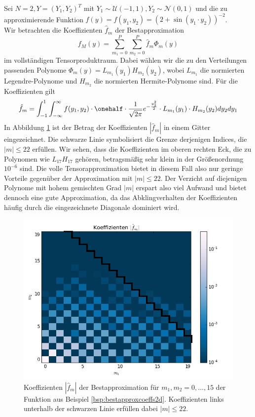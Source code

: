 \begin{mathbsp}
\label{bsp:bestapproxcoeffs2d}
Sei $N=2, Y=(Y_1,Y_2)^T$ mit $Y_1\sim \mathcal{U}(-1,1), Y_2\sim\mathcal{N}(0,1)$ und die zu approximierende Funktion $f(y)=f(y_1,y_2)=(2+\sin(y_1\cdot y_2))^{-2}$.\\
Wir betrachten die Koeffizienten $\hat{f}_m$ der Bestapproximation \[f_M(y)=\sum_{m_1=0}^P\sum_{m_2=0}^P\hat{f}_m\Phi_m(y)\] im vollständigen Tensorproduktraum. Dabei wählen wir die zu den Verteilungen passenden Polynome $\Phi_m(y)=L_{m_1}(y_1)H_{m_2}(y_2)$, wobei $L_{m_1}$ die normierten Legendre-Polynome und $H_{m_2}$ die normierten Hermite-Polynome sind. Für die Koeffizienten gilt
\[\hat{f}_m=\int_{-1}^1\int_{-\infty}^\infty f(y_1,y_2)\cdot \onehalf \cdot \frac{1}{\sqrt{2\pi}}e^{-\frac{y_2^2}{2}}\cdot L_{m_1}(y_1)\cdot H_{m_2}(y_2)dy_2dy_1\]
In Abbildung \ref{fig:bestapproxcoeffs2d} ist der Betrag der Koeffizienten $|\hat{f}_m|$ in einem Gitter eingezeichnet. Die schwarze Linie symbolisiert die Grenze derjenigen Indices, die $|m|\le 22$ erfüllen. Wir sehen, dass die Koeffizienten im oberen rechten Eck, die zu Polynomen wie $L_{17}H_{17}$ gehören, betragsmäßig sehr klein in der Größenordnung $10^{-6}$ sind. Die volle Tensorapproximation bietet in diesem Fall also nur geringe Vorteile gegenüber der Approximation mit $|m|\le 22$. Der Verzicht auf diejenigen Polynome mit hohem gemischten Grad $|m|$ erspart also viel Aufwand und bietet dennoch eine gute Approximation, da das Abklingverhalten der Koeffizienten häufig durch die eingezeichnete Diagonale dominiert wird.
\begin{figure}[!htb]
\includegraphics[width=\textwidth]{Figures/best_approx_coeffs_2d_example2log.png}
\caption{Koeffizienten $|\hat{f}_m|$ der Bestapproximation für $m_1,m_2=0,\dots,15$ der Funktion aus Beispiel \ref{bsp:bestapproxcoeffs2d}. Koeffizienten links unterhalb der schwarzen Linie erfüllen dabei $|m|\le 22$.}
\label{fig:bestapproxcoeffs2d}
\end{figure}
\end{mathbsp}

